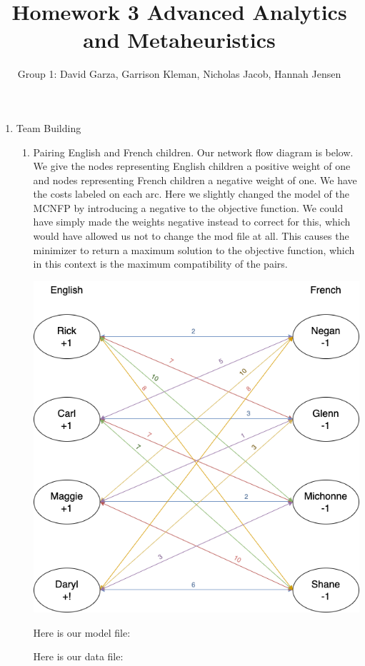 \documentclass[11pt]{article}
\author{Group 1:  David Garza,  Garrison Kleman, Nicholas Jacob, Hannah Jensen}
\title{Homework 3 Advanced Analytics and Metaheuristics}
\begin{document}
\maketitle

\begin{enumerate}
\item Team Building
\begin{enumerate}
\item Pairing English and French children.  Our network flow diagram is below. We give the nodes representing English children a positive weight of one and nodes representing French children a negative weight of one.  We have the costs labeled on each arc.  Here we slightly changed the model of the MCNFP by introducing a negative to the objective function.  We could have simply made the weights negative instead to correct for this, which would have allowed us not to change the mod file at all.  This causes the minimizer to return a maximum solution to the objective function, which in this context is the maximum compatibility of the pairs.

\includegraphics[width = .9\textwidth]{p1a flow diagram.png}

Here is our model file:

{\small {}}

Here is our data file:

{\small {}}


\end{enumerate}
\end{enumerate}
\end{document}
